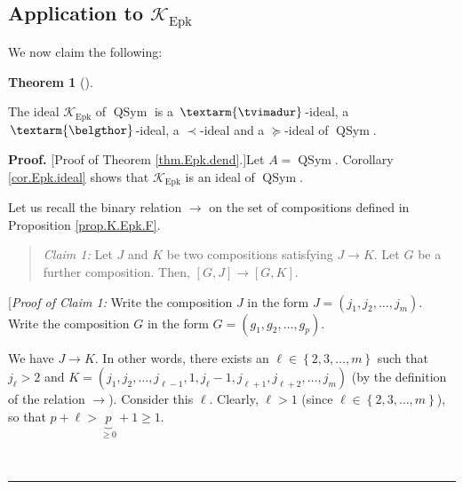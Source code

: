 \documentclass[numbers=enddot,12pt,final,onecolumn,notitlepage]{scrartcl}%
\theoremstyle{definition}
\newtheorem{theo}{Theorem}[section]
\newenvironment{theorem}[1][]
{\begin{theo}[#1]\begin{leftbar}}
{\end{leftbar}\end{theo}}
\newenvironment{statement}{\begin{quote}}{\end{quote}}
\newenvironment{proof}[1][Proof]{\noindent\textbf{#1.} }{\ \rule{0.5em}{0.5em}}
\newenvironment{verlong}{}{}
\newcommand{\tvi}{\left. \textarm{\tvimadur} \right.}
\newcommand{\bel}{\left. \textarm{\belgthor} \right.}
\begin{document}
\begin{verlong}
\subsection{Application to $\mathcal{K}_{\operatorname{Epk}}$}

We now claim the following:

\begin{theorem}
\label{thm.Epk.dend}The ideal $\mathcal{K}_{\operatorname{Epk}}$ of
$\operatorname*{QSym}$ is a $\tvi  $-ideal, a $\bel  $-ideal, a $\left.
\prec\right.  $-ideal and a $\left.  \succeq\right.  $-ideal of
$\operatorname*{QSym}$.
\end{theorem}

\begin{proof}
[Proof of Theorem \ref{thm.Epk.dend}.]Let $A=\operatorname*{QSym}$. Corollary
\ref{cor.Epk.ideal} shows that $\mathcal{K}_{\operatorname{Epk}}$ is an ideal
of $\operatorname*{QSym}$.

Let us recall the binary relation $\rightarrow$ on the set of compositions
defined in Proposition \ref{prop.K.Epk.F}.

\begin{statement}
\textit{Claim 1:} Let $J$ and $K$ be two compositions satisfying $J\rightarrow
K$. Let $G$ be a further composition. Then, $\left[  G,J\right]
\rightarrow\left[  G,K\right]  $.
\end{statement}

[\textit{Proof of Claim 1:} Write the composition $J$ in the form $J=\left(
j_{1},j_{2},\ldots,j_{m}\right)  $. Write the composition $G$ in the form
$G=\left(  g_{1},g_{2},\ldots,g_{p}\right)  $.

We have $J\rightarrow K$. In other words, there exists an $\ell\in\left\{
2,3,\ldots,m\right\}  $ such that $j_{\ell}>2$ and $K=\left(  j_{1}%
,j_{2},\ldots,j_{\ell-1},1,j_{\ell}-1,j_{\ell+1},j_{\ell+2},\ldots
,j_{m}\right)  $ (by the definition of the relation $\rightarrow$). Consider
this $\ell$. Clearly, $\ell>1$ (since $\ell\in\left\{  2,3,\ldots,m\right\}
$), so that $p+\ell>\underbrace{p}_{\geq0}+1\geq1$.


\end{proof}
\end{verlong}
\end{document}
